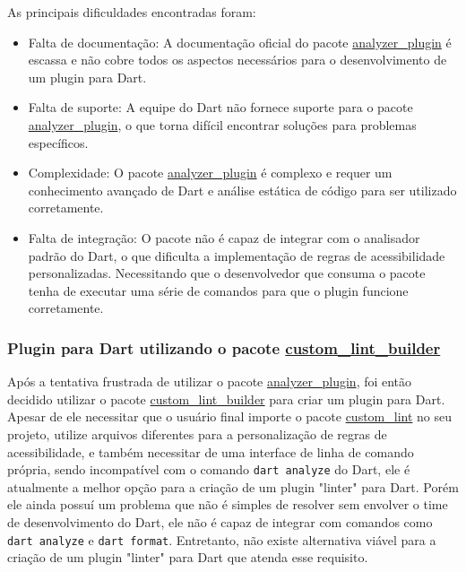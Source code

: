 As principais dificuldades encontradas foram: 

\begin{itemize}
	\item Falta de documentação: A documentação oficial do pacote \href{https://pub.dev/packages/analyzer_plugin}{analyzer\_plugin} é escassa e não cobre todos os aspectos necessários para o desenvolvimento de um plugin para Dart.
	\item Falta de suporte: A equipe do Dart não fornece suporte para o pacote \href{https://pub.dev/packages/analyzer_plugin}{analyzer\_plugin}, o que torna difícil encontrar soluções para problemas específicos.
	\item Complexidade: O pacote \href{https://pub.dev/packages/analyzer_plugin}{analyzer\_plugin} é complexo e requer um conhecimento avançado de Dart e análise estática de código para ser utilizado corretamente.
	\item Falta de integração: O pacote não é capaz de integrar com o analisador padrão do Dart, o que dificulta a implementação de regras de acessibilidade personalizadas. Necessitando que o desenvolvedor que consuma o pacote tenha de executar uma série de comandos para que o plugin funcione corretamente.
\end{itemize}

\subsubsection{Plugin para Dart utilizando o pacote \href{https://pub.dev/packages/custom_lint_builder}{custom\_lint\_builder}}

Após a tentativa frustrada de utilizar o pacote \href{https://pub.dev/packages/analyzer_plugin}{analyzer\_plugin}, foi então decidido utilizar o pacote \href{https://pub.dev/packages/custom_lint_builder}{custom\_lint\_builder} para criar um plugin para Dart. Apesar de ele necessitar que o usuário final importe o pacote \href{https://pub.dev/packages/custom_lint}{custom\_lint} no seu projeto, utilize arquivos diferentes para a personalização de regras de acessibilidade, e também necessitar de uma interface de linha de comando própria, sendo incompatível com o comando \texttt{dart analyze} do Dart, ele é atualmente a melhor opção para a criação de um plugin "linter" para Dart. Porém ele ainda possuí um problema que não é simples de resolver sem envolver o time de desenvolvimento do Dart, ele não é capaz de integrar com comandos como \texttt{dart analyze} e \texttt{dart format}. Entretanto, não existe alternativa viável para a criação de um plugin "linter" para Dart que atenda esse requisito. 

